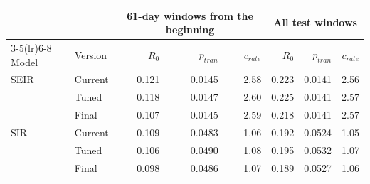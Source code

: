 \begin{tabular}{llrrrrrr}
\toprule
 &  & \multicolumn{3}{c}{61-day windows from the beginning} & \multicolumn{3}{c}{All test windows} \\
\cmidrule(lr){3-5}\cmidrule(lr){6-8}
Model & Version & $R_0$ & $p_{tran}$ & $c_{rate}$ & $R_0$ & $p_{tran}$ & $c_{rate}$ \\
\midrule
SEIR & Current & 0.121 & 0.0145 & 2.58 & 0.223 & 0.0141 & 2.56 \\
 & Tuned & 0.118 & 0.0147 & 2.60 & 0.225 & 0.0141 & 2.57 \\
 & Final & 0.107 & 0.0145 & 2.59 & 0.218 & 0.0141 & 2.57 \\
\midrule
SIR & Current & 0.109 & 0.0483 & 1.06 & 0.192 & 0.0524 & 1.05 \\
 & Tuned & 0.106 & 0.0490 & 1.08 & 0.195 & 0.0532 & 1.07 \\
 & Final & 0.098 & 0.0486 & 1.07 & 0.189 & 0.0527 & 1.06 \\
\bottomrule
\end{tabular}
